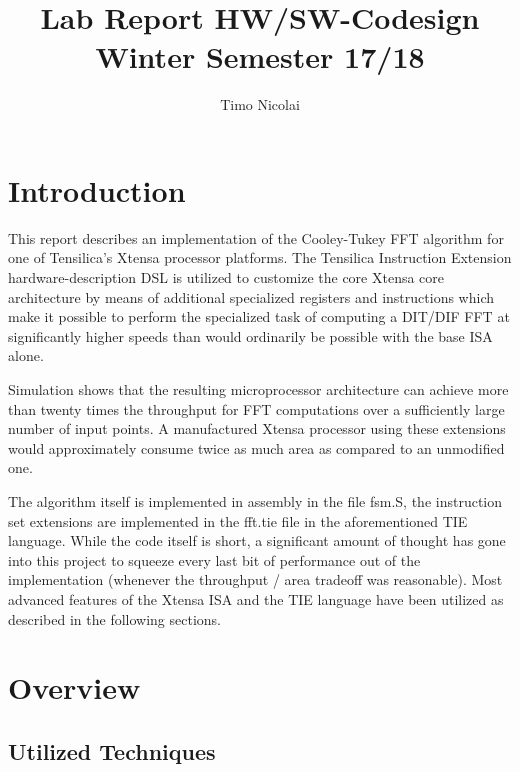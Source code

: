 \documentclass[ngerman, cd=lightcolor]{tudscrreprt}
\begin{document}

\title{%
  Lab Report HW/SW-Codesign \\
  Winter Semester 17/18
}
\author{%
  Timo Nicolai
}

\headingsvskip=-100pt

\date{}
\maketitle
\tableofcontents

\chapter{Introduction}

This report describes an implementation of the Cooley-Tukey FFT algorithm for
one of Tensilica's Xtensa processor platforms. The Tensilica Instruction
Extension hardware-description DSL is utilized to customize the core Xtensa
core architecture by means of additional specialized registers and instructions
which make it possible to perform the specialized task of computing a DIT/DIF
FFT at significantly higher speeds than would ordinarily be possible with the
base ISA alone.

Simulation shows that the resulting microprocessor architecture can achieve more
than twenty times the throughput for FFT computations over a sufficiently large
number of input points. A manufactured Xtensa processor using these extensions
would approximately consume twice as much area as compared to an unmodified one.

The algorithm itself is implemented in assembly in the file fsm.S,
the instruction set extensions are implemented in the fft.tie file
in the aforementioned TIE language. While the code itself is short, a significant
amount of thought has gone into this project to squeeze every last bit of
performance out of the implementation (whenever the throughput / area tradeoff
was reasonable). Most advanced features of the Xtensa ISA and the TIE language
have been utilized as described in the following sections.

\chapter{Overview}

\section{Utilized Techniques}
\end{document}
